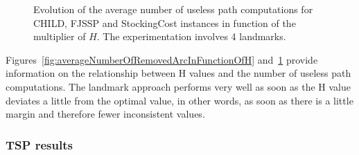 \begin{figure}[ht!]
\begin{subfigure}[t]{0.3\columnwidth}
{
    }
    \end{subfigure}
   \caption{Evolution of the average number of useless path computations for CHILD, FJSSP and StockingCost instances in function of the multiplier of $H$. The experimentation involves 4 landmarks.}
    \label{fig:averageNumberOfUselessArcInFunctionOfH}
\end{figure}

Figures~\ref{fig:averageNumberOfRemovedArcInFunctionOfH} and~\ref{fig:averageNumberOfUselessArcInFunctionOfH}  provide information on the relationship between H values and the number of useless path computations. The landmark approach performs very well as soon as the H value deviates a little from the optimal value, in other words, as soon as there is a little margin and therefore fewer inconsistent values. 

\subsubsection{TSP results}

